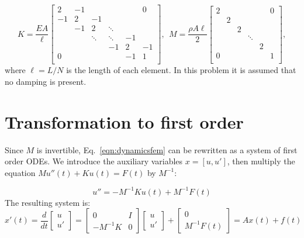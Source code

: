 \documentclass{article}
\begin{document}
\begin{equation*}
K = \dfrac{EA}{\ell}
\begin{bmatrix}
2 & -1 &  &  &  & 0  \\
-1  & 2 & -1 &   &  &  \\
& -1 & 2 & \ddots &  &  \\
&  & \ddots & \ddots & -1 &  \\
&  &  & -1 & 2 & -1 \\
0 &  &  &  & -1 & 1 \\
\end{bmatrix},~~ 
M = \dfrac{\rho A \ell}{2}
\begin{bmatrix}
	2 &  &  &  &  & 0  \\
	  & 2 &  &   &  &  \\
	 &  & 2 &  &  &  \\
	 &  &  & \ddots &  &  \\
	 &  &  & & 2 & \\
	0 &  &  &  &  & 1 \\
\end{bmatrix},
\label{eq:clampedMatrices}
\end{equation*}
where $\ell = L / N$ is the length of each element. %
%
In this problem it is assumed that no damping is present.

\section{Transformation to first order}
	
Since $M$ is invertible, Eq.~\eqref{eqn:dynamicsfem} can be rewritten as a system of first order ODEs. We introduce the auxiliary variables $x = [u, u']$, then multiply the equation $Mu''(t) + Ku(t) = F(t)$ by $M^{-1}$:

$$
u'' = -M^{-1}Ku(t) + M^{-1}F(t)
$$
The resulting system is:
$$
x'(t) =\dfrac{d}{dt} \begin{bmatrix} u \\ u' \end{bmatrix} = \begin{bmatrix} 0 & I \\ -M^{-1}K & 0 \end{bmatrix}\begin{bmatrix} u \\ u' \end{bmatrix} + \begin{bmatrix} 0 \\ M^{-1}F(t) \end{bmatrix} = Ax(t) + f(t)
$$
\end{document}
